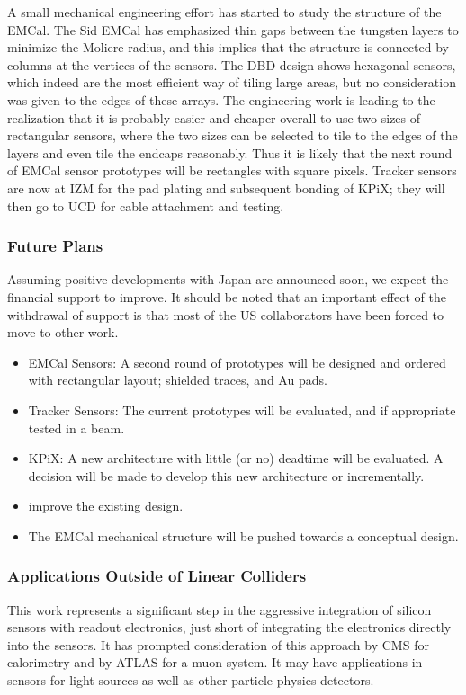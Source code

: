 A small mechanical engineering effort has started to study the structure of the EMCal. The Sid EMCal has emphasized thin gaps between the tungsten layers to minimize the Moliere radius, and this implies that the structure is connected by columns at the vertices of the sensors. The DBD design shows hexagonal sensors, which indeed are the most efficient way of tiling large areas, but no consideration was given to the edges of these arrays. The engineering work is leading to the realization that it is probably easier and cheaper overall to use two sizes of rectangular sensors, where the two sizes can be selected to tile to the edges of the layers and even tile the endcaps reasonably. Thus it is likely that the next round of EMCal sensor prototypes will be rectangles with square pixels.
Tracker sensors are now at IZM for the pad plating and subsequent bonding of KPiX; they will then go to UCD for cable attachment and testing.
\subsubsection{Future Plans}
Assuming positive developments with Japan are announced soon, we expect the financial support to improve. It should be noted that an important effect of the withdrawal of support is that most of the US collaborators have been forced to move to other work. 
\begin{itemize}
	\item EMCal Sensors: A second round of prototypes will be designed and ordered with rectangular layout; shielded traces, and Au pads.
	\item Tracker Sensors: The current prototypes will be evaluated, and if appropriate tested in a beam.
	\item KPiX: A new architecture with little (or no) deadtime will be evaluated. A decision will be made to develop this new architecture or incrementally.
	\item improve the existing design.
	\item The EMCal mechanical structure will be pushed towards a conceptual design.
\end{itemize}
\subsubsection{Applications Outside of Linear Colliders}
This work represents a significant step in the aggressive integration of silicon sensors with readout electronics, just short of integrating the electronics directly into the sensors. It has prompted consideration of this approach by CMS for calorimetry and by ATLAS for a muon system.  It may have applications in sensors for light sources as well as other particle physics detectors.
